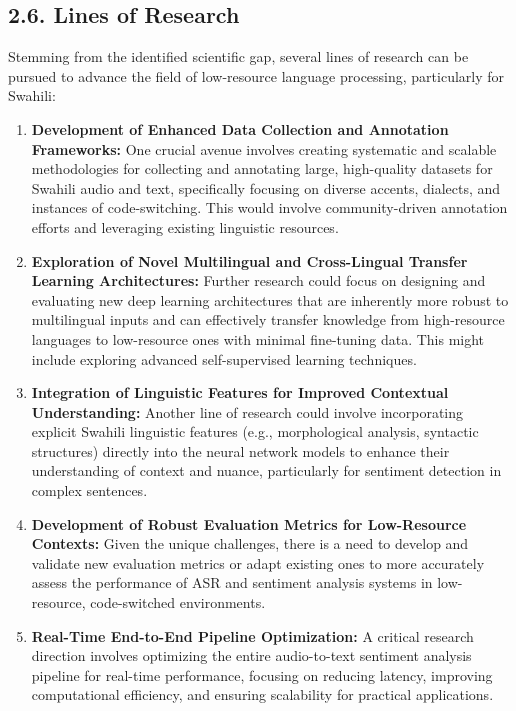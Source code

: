 \subsection*{2.6. Lines of Research} Stemming from the identified scientific gap, several lines of research can be pursued to advance the field of low-resource language processing, particularly for Swahili: \begin{enumerate} \item \textbf{Development of Enhanced Data Collection and Annotation Frameworks:} One crucial avenue involves creating systematic and scalable methodologies for collecting and annotating large, high-quality datasets for Swahili audio and text, specifically focusing on diverse accents, dialects, and instances of code-switching. This would involve community-driven annotation efforts and leveraging existing linguistic resources. \item \textbf{Exploration of Novel Multilingual and Cross-Lingual Transfer Learning Architectures:} Further research could focus on designing and evaluating new deep learning architectures that are inherently more robust to multilingual inputs and can effectively transfer knowledge from high-resource languages to low-resource ones with minimal fine-tuning data. This might include exploring advanced self-supervised learning techniques. \item \textbf{Integration of Linguistic Features for Improved Contextual Understanding:} Another line of research could involve incorporating explicit Swahili linguistic features (e.g., morphological analysis, syntactic structures) directly into the neural network models to enhance their understanding of context and nuance, particularly for sentiment detection in complex sentences. \item \textbf{Development of Robust Evaluation Metrics for Low-Resource Contexts:} Given the unique challenges, there is a need to develop and validate new evaluation metrics or adapt existing ones to more accurately assess the performance of ASR and sentiment analysis systems in low-resource, code-switched environments. \item \textbf{Real-Time End-to-End Pipeline Optimization:} A critical research direction involves optimizing the entire audio-to-text sentiment analysis pipeline for real-time performance, focusing on reducing latency, improving computational efficiency, and ensuring scalability for practical applications. \end{enumerate} 

